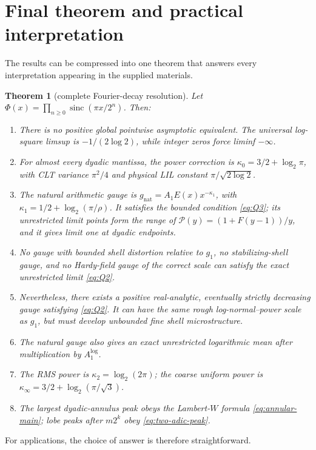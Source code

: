 \documentclass[11pt,oneside]{article}
\newtheorem{theorem}{Theorem}[section]
\theoremstyle{definition}
\theoremstyle{remark}
\newcommand{\sinc}{\operatorname{sinc}}
\begin{document}
\section{Final theorem and practical interpretation}
\label{sec:final}

The results can be compressed into one theorem that answers every interpretation
appearing in the supplied materials.

\begin{theorem}[complete Fourier-decay resolution]
\label{thm:complete}
Let
\(\Phi(x)=\prod_{n\ge0}\sinc(\pi x/2^n)\).  Then:
\begin{enumerate}
\item There is no positive global pointwise asymptotic equivalent.  The
universal log-square limsup is \(-1/(2\log2)\), while integer zeros force
liminf \(-\infty\).
\item For almost every dyadic mantissa, the power correction is
\(\kappa_0=3/2+\log_2\pi\), with CLT variance \(\pi^2/4\) and physical LIL
constant \(\pi/\sqrt{2\log2}\).
\item The natural arithmetic gauge is
\(g_{\mathrm{nat}}=A_1E(x)x^{-\kappa_1}\), with
\(\kappa_1=1/2+\log_2(\pi/\rho)\).  It satisfies the bounded condition
\eqref{eq:Q3}; its unrestricted limit points form the range of
\(\mathscr P(y)=(1+F(y-1))/y\), and it gives limit one at dyadic endpoints.
\item No gauge with bounded shell distortion relative to \(g_1\), no
stabilizing-shell gauge, and no Hardy-field gauge of the correct scale can
satisfy the exact unrestricted limit \eqref{eq:Q2}.
\item Nevertheless, there exists a positive real-analytic, eventually strictly
decreasing gauge satisfying \eqref{eq:Q2}.  It can have the same rough
log-normal--power scale as \(g_1\), but must develop unbounded fine shell
microstructure.
\item The natural gauge also gives an exact unrestricted logarithmic mean after
multiplication by \(A_1^{\log}\).
\item The RMS power is \(\kappa_2=\log_2(2\pi)\); the coarse uniform power is
\(\kappa_\infty=3/2+\log_2(\pi/\sqrt3)\).
\item The largest dyadic-annulus peak obeys the Lambert-\(W\) formula
\eqref{eq:annular-main}; lobe peaks after \(m2^k\) obey
\eqref{eq:two-adic-peak}.
\end{enumerate}
\end{theorem}

For applications, the choice of answer is therefore straightforward.
\end{document}
